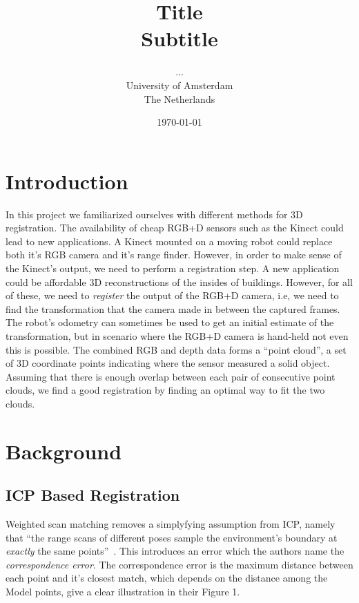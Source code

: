 \documentclass[a4paper]{article}
\title{Title\\
{\large Subtitle}}
\author{...\\
  University of Amsterdam\\
  The Netherlands}
\date{\today}
\begin{document}
\maketitle

\section{Introduction}

In this project we familiarized ourselves with different methods for 3D registration. The availability of cheap RGB+D sensors such as the Kinect could lead to new applications. A Kinect mounted on a moving robot could replace both it's RGB camera and it's range finder. However, in order to make sense of the Kinect's output, we need to perform a registration step. A new application could be affordable 3D reconstructions of the insides of buildings. However, for all of these, we need to \emph{register} the output of the RGB+D camera, i.e, we need to find the transformation that the camera made in between the captured frames. The robot's odometry can sometimes be used to get an initial estimate of the transformation, but in scenario where the RGB+D camera is hand-held not even this is possible. The combined RGB and depth data forms a ``point cloud'', a set of 3D coordinate points indicating where the sensor measured a solid object. Assuming that there is enough overlap between each pair of consecutive point clouds, we find a good registration by finding an optimal way to fit the two clouds.

\section{Background}

\subsection{ICP Based Registration}

Weighted scan matching removes a simplyfying assumption from ICP, namely that ``the range scans of different poses sample the environment's boundary at \emph{exactly} the same points''~\cite{pfister2002weighted}. This introduces an error which the authors name the \emph{correspondence error}. The correspondence error is the maximum distance between each point and it's closest match, which depends on the distance among the Model points, \cite{slamet2008boosting} give a clear illustration in their Figure 1. 
\end{document}
